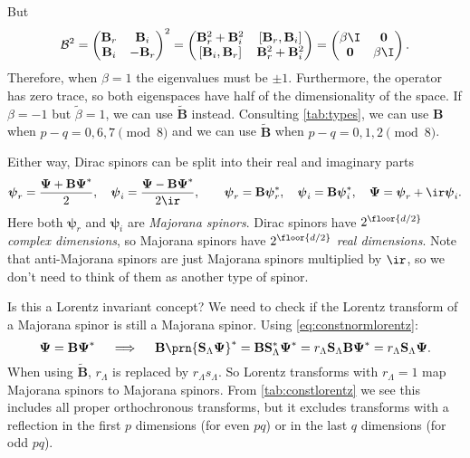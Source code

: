 \documentclass[11pt]{article}
\renewcommand{\S}{\mathbf{S}}
\newcommand{\B}{\mathbf{B}}
\newcommand{\Bt}{\widetilde{\B}}
\newcommand{\psib}{\boldsymbol{\psi}}
\newcommand{\Psib}{\boldsymbol{\Psi}}
\newcommand{\betat}{\tilde{\beta}}
\begin{document}
But
%
\begin{equation*}
  \mathcal{B}^2 =
    \begin{pmatrix}
      \B_r &  \B_i \\
      \B_i & -\B_r \\
    \end{pmatrix}^2
  =
    \begin{pmatrix}
      \B_r^2 + \B_i^2 & [\B_r, \B_i]    \\
      [\B_i, \B_r]    & \B_r^2 + \B_i^2 \\
    \end{pmatrix}
  =
    \begin{pmatrix}
      \beta \I   & \mathbf{0} \\
      \mathbf{0} & \beta \I   \\
    \end{pmatrix}.
\end{equation*}
%
Therefore, when $\beta=1$ the eigenvalues must be $\pm 1$.
Furthermore, the operator has zero trace, so both eigenspaces have half of the dimensionality of the space.
If $\beta=-1$ but $\betat=1$, we can use $\Bt$ instead.
Consulting \cref{tab:types}, we can use $\B$ when $p-q = 0,6,7 \pmod 8$ and we can use $\Bt$ when $p-q = 0,1,2 \pmod 8$.

Either way, Dirac spinors can be split into their real and imaginary parts
%
\begin{equation}\label{eq:majorana}
  \psib_r = \frac{\Psib + \B \Psib^\ast}{2},
  \quad
  \psib_i = \frac{\Psib - \B \Psib^\ast}{2\ir},
  \qquad
  \psib_r = \B \psib^\ast_r,
  \quad
  \psib_i = \B \psib^\ast_i,
  \quad
  \Psib = \psib_r + \ir \psib_i.
\end{equation}
%
Here both $\psib_r$ and $\psib_i$ are \emph{Majorana spinors}.
Dirac spinors have $2^{\floor{d/2}}$ \emph{complex dimensions}, so Majorana spinors have $2^{\floor{d/2}}$ \emph{real dimensions}.
Note that anti-Majorana spinors are just Majorana spinors multiplied by $\ir$, so we don't need to think of them as another type of spinor.

Is this a Lorentz invariant concept?
We need to check if the Lorentz transform of a Majorana spinor is still a Majorana spinor.
Using \cref{eq:constnormlorentz}:
%
\begin{equation*}
  \Psib = \B \Psib^\ast
  \quad\implies\quad
  \B \prn{\S_\Lambda \Psib}^\ast 
    = \B \S_\Lambda^\ast \Psib^\ast 
    = r_\Lambda \S_\Lambda \B \Psib^\ast 
    = r_\Lambda \S_\Lambda \Psib.
\end{equation*}
%
When using \(\Bt\), \(r_\Lambda\) is replaced by \(r_\Lambda s_\Lambda\).
So Lorentz transforms with \(r_\Lambda = 1\) map Majorana spinors to Majorana spinors.
From \cref{tab:constlorentz} we see this includes all proper orthochronous transforms, but it excludes transforms with a reflection in the first \(p\) dimensions (for even \(pq\)) or in the last \(q\) dimensions (for odd \(pq\)).
\end{document}
